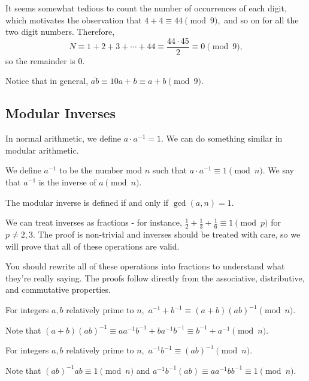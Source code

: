 \documentclass[mast]{lucky}
\begin{document}
\begin{sol}
It seems somewhat tedious to count the number of occurrences of each digit, which motivates the observation that $4+4\equiv 44\pmod{9},$ and so on for all the two digit numbers. Therefore,
\[N\equiv 1+2+3+\cdots+44\equiv\frac{44\cdot 45}{2}\equiv 0\pmod{9},\]
so the remainder is $0.$
\end{sol}
Notice that in general, $\overline{ab}\equiv 10a+b\equiv a+b\pmod{9}.$

\subsection{Modular Inverses}
In normal arithmetic, we define $a\cdot a^{-1}=1.$ We can do something similar in modular arithmetic.

\begin{defi}
We define $a^{-1}$ to be the number mod $n$ such that $a\cdot a^{-1}\equiv 1 \pmod{n}.$ We say that $a^{-1}$ is the inverse of $a \pmod{n}.$\end{defi}

The modular inverse is defined if and only if $\gcd(a,n)=1.$

We can treat inverses as fractions - for instance, $\frac{1}{2}+\frac{1}{3}+\frac{1}{6}\equiv 1\pmod{p}$ for $p\neq 2,3.$ The proof is non-trivial and inverses should be treated with care, so we will prove that all of these operations are valid.

You should rewrite all of these operations into fractions to understand what they're really saying. The proofs follow directly from the associative, distributive, and commutative properties.

\begin{fact}
For integers $a,b$ relatively prime to $n,$ $a^{-1}+b^{-1}\equiv (a+b)(ab)^{-1}\pmod{n}.$
\end{fact}

\begin{pro}
Note that $(a+b)(ab)^{-1}\equiv aa^{-1}b^{-1}+ba^{-1}b^{-1}\equiv b^{-1}+a^{-1}\pmod{n}.$
\end{pro}

\begin{fact}
For integers $a,b$ relatively prime to $n,$ $a^{-1}b^{-1}\equiv(ab)^{-1}\pmod{n}.$
\end{fact}

\begin{pro}
Note that $(ab)^{-1}ab\equiv 1\pmod{n}$ and $a^{-1}b^{-1}(ab)\equiv aa^{-1}bb^{-1}\equiv 1\pmod{n}.$
\end{pro}
\end{document}
